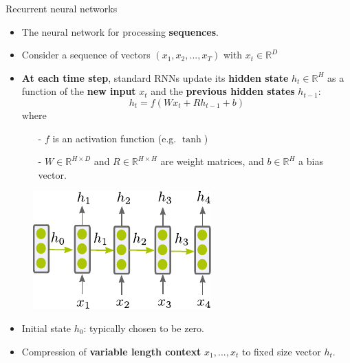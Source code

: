 \begin{frame}{Recurrent neural networks}
\vspace{-3mm}
\begin{itemize}
\item The neural network for processing \textbf{sequences}.
\item Consider a sequence of vectors $(x_1, x_2, ..., x_T)$ with $x_t \in \mathbb{R}^D$
\end{itemize}
\begin{itemize}
\item \textbf{At each time step}, standard RNNs update its \textbf{hidden state} $h_t \in \mathbb{R}^H$ as a function of the \textbf{new input} $x_t$ and the \textbf{previous hidden states} $h_{t-1}$:
\[
h_t = f(W x_t + R h_{t-1} + b)
\]
where
\begin{itemize}
\item[-] $f$ is an activation function (e.g. $\tanh$)
\item[-] $W \in \mathbb{R}^{H \times D}$ and $R  \in \mathbb{R}^{H \times H}$
 are weight matrices, and $b \in \mathbb{R}^H$ a bias vector. 
\end{itemize}
\end{itemize}
\begin{figure}
                        \centering
                        \includegraphics[width=.25\linewidth]{./figures/rnn.pdf}
\end{figure}
\begin{itemize}
\item Initial state $h_0$: typically chosen to be zero.
\item Compression of \textbf{variable length context} $x_1, ..., x_{t}$ to fixed size vector $h_t$.
\end{itemize}
\end{frame}


